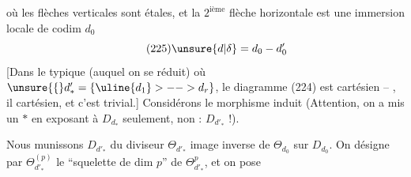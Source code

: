 où les flèches verticales sont étales,
et la $2^{\mathrm{ième}}$ flèche horizontale est une
immersion locale de codim $d_0$
\[
\tag{225}\unsure{d|\delta}=d_0-d'_0
\]
[Dans le typique (auquel on se réduit)
où $\unsure{\{}d'_* = \{\uline{d_1}>-- >d_r\}$, le diagramme
(224) est cartésien -- , il
  cartésien,  et c'est trivial.]
Considérons le morphisme induit
(Attention, on a mis un $*$ en exposant
à $D_{d_*}$ seulement, non : $D_{d'_*}$ !).

Nous munissons $D_{d'_*}$ du diviseur
$\Theta_{d'_*}$ image inverse de $\Theta_{d_0}$ sur $D_{d_0}$.
On désigne par $\Theta_{d'_*}^{(p)}$ le ``squelette
de dim $p$'' de $\Theta_{d'_*}^{p}$, et  on pose
